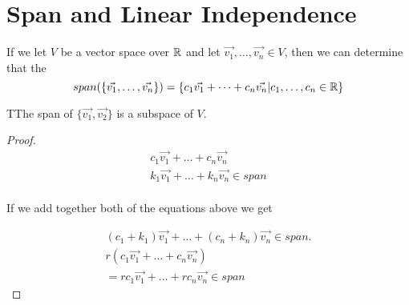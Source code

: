\section{Span and Linear Independence}

  If we let $V$ be a vector space over $\mathbb{R}$ and let $\vec{v_1},\dots,\vec{v_n}\in V$, then we can determine that the 
  \begin{equation}
    span(\{\vec{v_1},\dots,\vec{v_n}\})=\{c_1\vec{v_1}+\dots+c_n\vec{v_n}|c_1,\dots,c_n\in\mathbb{R}\}
  \end{equation}

  \begin{proposition}
    TThe span of $\{\vec{v_1},\vec{v_2}\}$ is a subspace of $V$.
    \begin{proof}
      \begin{align}
        c_1\vec{v_1}+\dots+c_n\vec{v_n}\\
        k_1\vec{v_1}+\dots+k_n\vec{v_n}\in span\\
      \end{align}

      If we add together both of the equations above we get

      \begin{align}
        (c_1+k_1)\vec{v_1}+\dots+(c_n+k_n)\vec{v_n}\in span.\\
        r(c_1\vec{v_1}+\dots+c_n\vec{v_n})\\
        =rc_1\vec{v_1}+\dots+rc_n\vec{v_n}\in span
      \end{align}
    \end{proof}
  \end{proposition}

